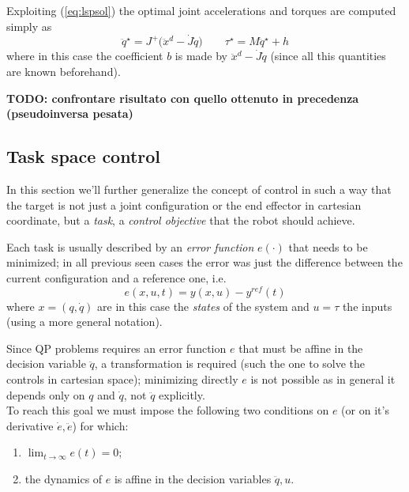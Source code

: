 	Exploiting (\ref{eq:lspsol}) the optimal joint accelerations and torques are computed simply as
	\[ \ddot q^\star = J^+ \big(\ddot x^d - \dot J\dot q\big) \qquad \tau^\star = M \ddot q^\star + h \tag{$\triangle$} \]
	where in this case the coefficient $b$ is made by $\ddot x^d - \dot J \dot q$ (since all this quantities are known beforehand).
	
	\textbf{TODO: confrontare risultato con quello ottenuto in precedenza (pseudoinversa pesata)}
	
	
\subsection{Task space control}
	In this section we'll further generalize the concept of control in such a way that the target is not just a joint configuration or the end effector in cartesian coordinate, but a \textit{task}, a \textit{control objective} that the robot should achieve.
	
	Each task is usually described by an \textit{error function} $e(\cdot)$ that needs to be minimized; in all previous seen cases the error was just the difference between the current configuration and a reference one, i.e.
	\begin{equation}
		e(x,u,t) = y(x,u) - y^{ref}(t)
	\end{equation}
	where $x = (q,\dot q)$ are in this case the \textit{states} of the system and $u=\tau$ the inputs (using a more general notation).
	
	Since QP problems requires an error function $e$ that must be affine in the decision variable $\ddot q$, a transformation is required (such the one to solve the controls in cartesian space); minimizing directly $e$ is not possible as in general it depends only on $q$ and $\dot q$, not $\ddot q$ explicitly.\\
	To reach this goal we must impose the following two conditions on $e$ (or on it's derivative $\dot e,\ddot e$) for which:
	\begin{enumerate}
		\item $\lim_{t\rightarrow \infty} e(t) = 0$;
		\item the dynamics of $e$ is affine in the decision variables $\ddot q, u$.
	\end{enumerate}
	
